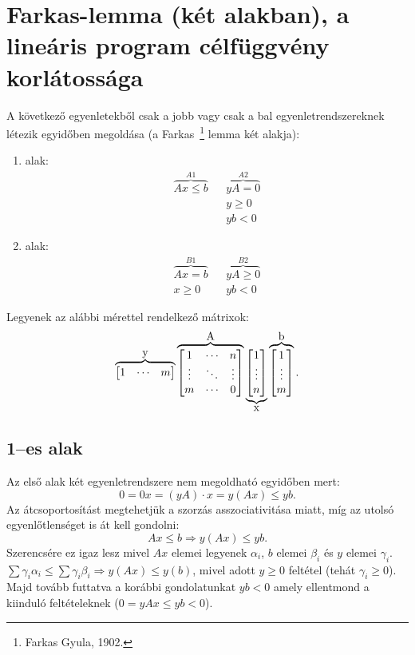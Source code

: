 \skiptooddpage%
\section{Farkas-lemma (két alakban), a lineáris program célfüggvény korlátossága}

A következő egyenletekből csak a jobb vagy csak a bal egyenletrendszereknek
létezik egyidőben megoldása (a Farkas~\footnote{Farkas Gyula, 1902.} lemma két
alakja):

\begin{enumerate}
	\item alak: \begin{align*}
		      \overbrace{Ax \leq b}^{A1} &  & \overbrace{yA= 0}^{A2} \\
		                                 &  & y\geq 0                \\
		                                 &  & yb< 0
	      \end{align*}
	\item alak:\begin{align*}
		      \overbrace{Ax = b }^{B1} &  & \overbrace{yA \geq 0}^{B2} \\
		      x \geq 0                 &  & yb < 0
	      \end{align*}
\end{enumerate}

Legyenek az alábbi mérettel rendelkező mátrixok:
\[
	\overbrace{\begin{bmatrix} 1 &  \cdots &  m \end{bmatrix}}^{\hbox{y}}
	\overbrace{\begin{bmatrix} 1 & \cdots & n \\ \vdots & \ddots & \vdots \\ m  & \cdots & 0 \end{bmatrix}}^{\hbox{A}}
	\underbrace{\begin{bmatrix} 1 \\ \vdots \\  n \end{bmatrix}}_{\hbox{x}}
	\overbrace{\begin{bmatrix} 1 \\ \vdots \\  m \end{bmatrix}}^{\hbox{b}}.
\]

\subsection{1--es alak}
Az első alak két egyenletrendszere nem megoldható egyidőben mert:
\[ 0 = 0x = (yA) \cdot x = y(Ax) \leq yb.\] Az átcsoportosítást megtehetjük a
szorzás asszociativitása miatt, míg az utolsó egyenlőtlenséget is át kell
gondolni: \[ Ax \leq b \Rightarrow y(Ax) \leq yb.\] Szerencsére ez igaz lesz
mivel $Ax$ elemei legyenek $\alpha_i$, $b$ elemei $\beta_i$ és $y$ elemei
$\gamma_i$.
$\sum\gamma_i \alpha_i \leq \sum \gamma_i \beta_i \Rightarrow y(Ax) \leq y(b)$,
mivel adott $y \geq 0$ feltétel (tehát $\gamma_i \geq 0$). Majd tovább futtatva a
korábbi gondolatunkat $yb<0$ amely ellentmond a kiinduló feltételeknek ($0=yAx \leq yb<0$).

